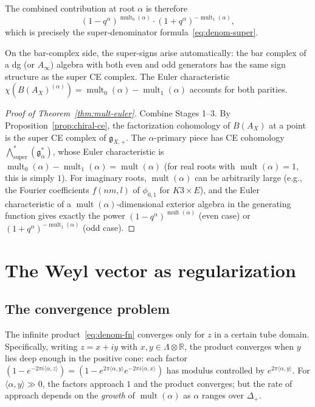 \documentclass[11pt]{article}
\theoremstyle{definition}
\theoremstyle{remark}
\DeclareMathOperator{\mult}{mult}
\newcommand{\frakg}{\mathfrak{g}}
\begin{document}
The combined contribution at root $\alpha$ is therefore
\[
 (1 - q^\alpha)^{\mult_0(\alpha)} \cdot (1 + q^\alpha)^{-\mult_1(\alpha)},
\]
which is precisely the super-denominator formula~\eqref{eq:denom-super}.

On the bar-complex side, the super-signs arise automatically: the bar
complex of a dg (or $A_\infty$) algebra with both even and odd generators
has the same sign structure as the super CE complex. The Euler
characteristic $\chi(B(A_X)^{(\alpha)}) = \mult_0(\alpha) - \mult_1(\alpha)$
accounts for both parities.

\begin{proof}[Proof of Theorem~\ref{thm:mult-euler}]
Combine Stages 1--3. By Proposition~\ref{prop:chiral-ce}, the
factorization cohomology of $B(A_X)$ at a point is the super CE complex
of $\frakg_{X,+}$. The $\alpha$-primary piece has CE cohomology
$\bigwedge^*_{\mathrm{super}}(\frakg_\alpha^*)$, whose Euler
characteristic is $\mult_0(\alpha) - \mult_1(\alpha) = \mult(\alpha)$
(for real roots with $\mult(\alpha) = 1$, this is simply $1$).
For imaginary roots, $\mult(\alpha)$ can be arbitrarily large (e.g.,
the Fourier coefficients $f(nm,l)$ of $\phi_{0,1}$ for $K3 \times E$),
and the Euler characteristic of a $\mult(\alpha)$-dimensional exterior
algebra in the generating function gives exactly the power
$(1-q^\alpha)^{\mult(\alpha)}$ (even case) or
$(1+q^\alpha)^{-\mult_1(\alpha)}$ (odd case).
\end{proof}


\section{The Weyl vector as regularization}
\label{sec:weyl-rho}

\subsection{The convergence problem}

The infinite product~\eqref{eq:denom-fn} converges only for $z$ in a
certain tube domain. Specifically, writing $z = x + iy$ with
$x,y \in \Lambda \otimes \mathbb{R}$, the product converges when
$y$ lies deep enough in the positive cone: each factor
$(1 - e^{-2\pi i\langle\alpha,z\rangle}) = (1 - e^{2\pi\langle\alpha,y\rangle}
e^{-2\pi i\langle\alpha,x\rangle})$ has modulus controlled by
$e^{2\pi\langle\alpha,y\rangle}$. For $\langle\alpha,y\rangle \gg 0$,
the factors approach $1$ and the product converges; but the rate of
approach depends on the \emph{growth} of $\mult(\alpha)$ as $\alpha$
ranges over $\Delta_+$.
\end{document}
